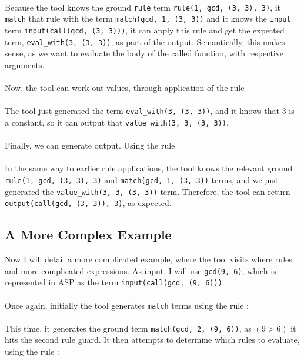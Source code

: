 
\mbox{} \\
Because the tool knows the ground \lstinline{rule} term \lstinline{rule(1, gcd, (3, 3), 3)}, it \lstinline{match} that rule with the term \lstinline{match(gcd, 1, (3, 3))} and it knows the \lstinline{input} term \lstinline{input(call(gcd, (3, 3)))}, it can apply this rule and get the expected term, \lstinline{eval_with(3, (3, 3))}, as part of the output. Semantically, this makes sense, as we want to evaluate the body of the called function, with respective arguments. \\ \\%
Now, the tool can work out values, through application of the rule \\


\mbox{} \\
The tool just generated the term \lstinline{eval_with(3, (3, 3))}, and it knows that 3 is a constant, so it can output that \lstinline{value_with(3, 3, (3, 3))}. \\ \\
Finally, we can generate output. Using the rule \\


\mbox{} \\
In the same way to earlier rule applications, the tool knows the relevant ground \lstinline{rule(1, gcd, (3, 3), 3)} and \lstinline{match(gcd, 1, (3, 3))} terms, and we just generated the \lstinline{value_with(3, 3, (3, 3))} term. Therefore, the tool can return \lstinline{output(call(gcd, (3, 3)), 3)}, as expected.

\subsection{A More Complex Example}
Now I will detail a more complicated example, where the tool visits where rules and more complicated expressions. As input, I will use \lstinline{gcd(9, 6)}, which is represented in ASP as the term \lstinline{input(call(gcd, (9, 6)))}. \\ \\
Once again, initially the tool generates \lstinline{match} terms using the rule : \\ %


\mbox{} \\
This time, it generates the ground term \lstinline{match(gcd, 2, (9, 6))}, as $(9 > 6)$ it hits the second rule guard. It then attempts to determine which rules to evaluate, using the rule : \\ %

